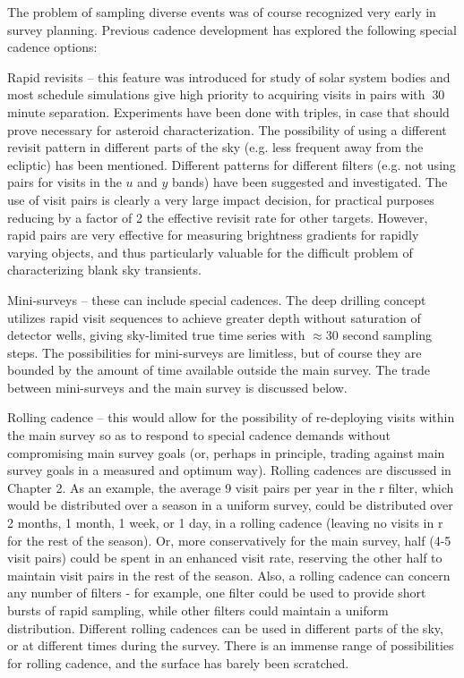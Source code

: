 The problem of sampling diverse events was of course recognized very
early in survey planning. Previous cadence development has explored the
following special cadence options:

\begin{description}

\item{Rapid revisits} -- this feature was introduced for study of solar
system bodies and most schedule simulations give high priority to
acquiring visits in pairs with $~$30 minute separation.  Experiments
have been done with triples, in case that should prove necessary for
asteroid characterization.  The possibility of using a different revisit
pattern in different parts of the sky (e.g. less frequent away from the
ecliptic) has been mentioned.  Different patterns for different filters
(e.g. not using pairs for visits in the $u$ and $y$ bands) have been
suggested and investigated. The use of visit pairs is clearly a very
large impact decision, for practical purposes reducing by a factor of 2
the effective revisit rate for other targets. However, rapid pairs are
very effective for measuring brightness gradients for rapidly varying
objects, and thus particularly valuable for the difficult problem of
characterizing blank sky transients.

\item{Mini-surveys} --  these can include special cadences. The deep
drilling concept utilizes rapid visit sequences to achieve greater depth
without saturation of detector wells, giving sky-limited true time
series with $\approx$30 second sampling steps.  The possibilities for
mini-surveys are limitless, but of course they are bounded by the amount
of time available outside the main survey. The trade between
mini-surveys and the main survey is discussed below.

\item{Rolling cadence} -- this would allow for the possibility of
re-deploying visits within the main survey so as to respond to special
cadence demands without compromising main survey goals (or, perhaps in
principle, trading against main survey goals in a measured and optimum
way). Rolling cadences are discussed in Chapter 2.  As an example, the
average 9 visit pairs per year in the r filter, which would be
distributed over a season in a uniform survey, could be distributed over
2 months, 1 month, 1 week, or 1 day, in a rolling cadence (leaving no
visits in r for the rest of the season).  Or, more conservatively for
the main survey, half (4-5 visit pairs) could be spent in an enhanced
visit rate, reserving the other half to maintain visit pairs in the rest
of the season.  Also, a rolling cadence can concern any number of
filters - for example, one filter could be used to provide short bursts
of rapid sampling, while other filters could maintain a uniform
distribution.  Different rolling cadences can be used in different parts
of the sky, or at different times during the survey.  There is an
immense range of possibilities for rolling cadence, and the surface has
barely been scratched.


\end{description}
